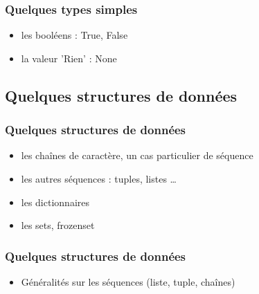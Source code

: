 \begin{frame}[fragile]
  \frametitle{Quelques types simples}
  \begin{itemize}
    \item les booléens : \alert{True, False}
    \item la valeur 'Rien' : \alert{None}
  \end{itemize}
\begin{ipython}
\end{ipython}
\end{frame}


\subsection{Quelques structures de données}
\begin{frame}
  \frametitle{Quelques structures de données}
  \begin{itemize}
    \item<1-> les chaînes de caractère, un cas particulier de séquence
    \item<2-> les autres séquences : tuples, listes \ldots
    \item<3-> les dictionnaires
    \item<4-> les sets, frozenset
  \end{itemize}
\end{frame}

\begin{frame}[fragile]
\frametitle{Quelques structures de données}
\begin{itemize}
\item Généralités sur les séquences (liste, tuple, chaînes)
\end{itemize}
\begin{ipython}
\ipoutp{[1,2,3]}
\end{ipython}
\end{frame}

